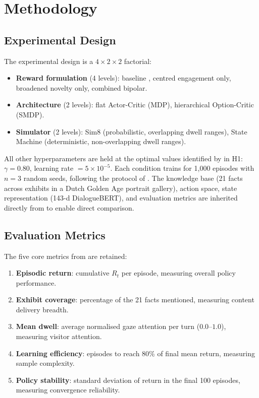\documentclass[12pt,a4paper]{article}
\begin{document}
\section{Methodology}
\label{sec:method}

\subsection{Experimental Design}

The experimental design is a $4 \times 2 \times 2$ factorial:
\begin{itemize}[nosep]
    \item \textbf{Reward formulation} (4 levels): baseline \citep{bourdon2025}, centred engagement only, broadened novelty only, combined bipolar.
    \item \textbf{Architecture} (2 levels): flat Actor-Critic (MDP), hierarchical Option-Critic (SMDP).
    \item \textbf{Simulator} (2 levels): Sim8 (probabilistic, overlapping dwell ranges), State Machine (deterministic, non-overlapping dwell ranges).
\end{itemize}

All other hyperparameters are held at the optimal values identified by \citet{bourdon2025} in H1: $\gamma = 0.80$, learning rate $= 5 \times 10^{-5}$. Each condition trains for 1{,}000 episodes with $n = 3$ random seeds, following the protocol of \citet{bourdon2025}. The knowledge base (21 facts across exhibits in a Dutch Golden Age portrait gallery), action space, state representation (143-d DialogueBERT), and evaluation metrics are inherited directly from \citet{bourdon2025} to enable direct comparison.

\subsection{Evaluation Metrics}

The five core metrics from \citet{bourdon2025} are retained:
\begin{enumerate}[nosep]
    \item \textbf{Episodic return}: cumulative $R_t$ per episode, measuring overall policy performance.
    \item \textbf{Exhibit coverage}: percentage of the 21 facts mentioned, measuring content delivery breadth.
    \item \textbf{Mean dwell}: average normalised gaze attention per turn ($0.0$--$1.0$), measuring visitor attention.
    \item \textbf{Learning efficiency}: episodes to reach 80\% of final mean return, measuring sample complexity.
    \item \textbf{Policy stability}: standard deviation of return in the final 100 episodes, measuring convergence reliability.
\end{enumerate}
\end{document}
